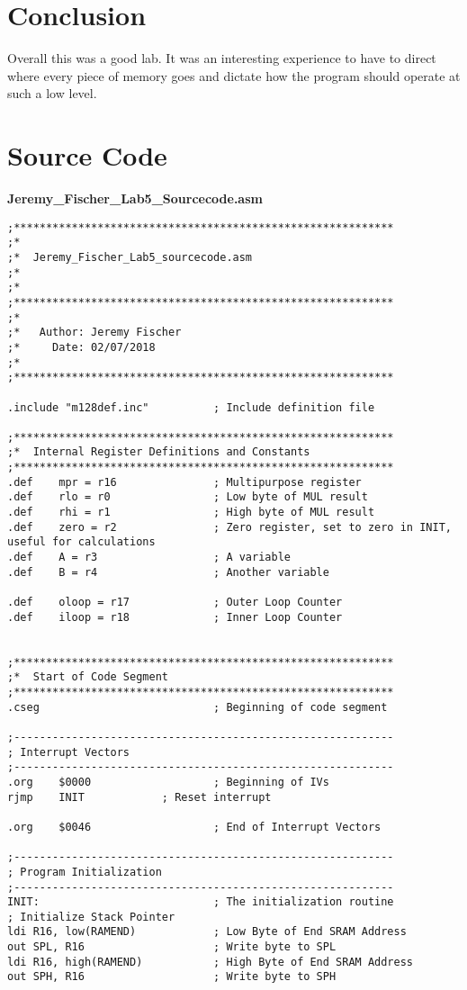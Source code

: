 \documentclass[12pt,letterpaper]{article}
\begin{document}
\section{Conclusion}
	Overall this was a good lab.
	It was an interesting experience to have to direct where every piece of memory goes and dictate how the program should operate at such a low level.

\section{Source Code}
	\textbf{Jeremy\_Fischer\_Lab5\_Sourcecode.asm}
	\begin{verbatim}
;***********************************************************
;*
;*	Jeremy_Fischer_Lab5_sourcecode.asm
;*
;*
;***********************************************************
;*
;*	 Author: Jeremy Fischer
;*	   Date: 02/07/2018
;*
;***********************************************************

.include "m128def.inc"			; Include definition file

;***********************************************************
;*	Internal Register Definitions and Constants
;***********************************************************
.def	mpr = r16				; Multipurpose register 
.def	rlo = r0				; Low byte of MUL result
.def	rhi = r1				; High byte of MUL result
.def	zero = r2				; Zero register, set to zero in INIT, useful for calculations
.def	A = r3					; A variable
.def	B = r4					; Another variable

.def	oloop = r17				; Outer Loop Counter
.def	iloop = r18				; Inner Loop Counter


;***********************************************************
;*	Start of Code Segment
;***********************************************************
.cseg							; Beginning of code segment

;-----------------------------------------------------------
; Interrupt Vectors
;-----------------------------------------------------------
.org	$0000					; Beginning of IVs
rjmp 	INIT			; Reset interrupt

.org	$0046					; End of Interrupt Vectors

;-----------------------------------------------------------
; Program Initialization
;-----------------------------------------------------------
INIT:							; The initialization routine
; Initialize Stack Pointer
ldi R16, low(RAMEND) 			; Low Byte of End SRAM Address
out SPL, R16 					; Write byte to SPL
ldi R16, high(RAMEND) 			; High Byte of End SRAM Address
out SPH, R16 					; Write byte to SPH	


\end{verbatim}
\end{document}
